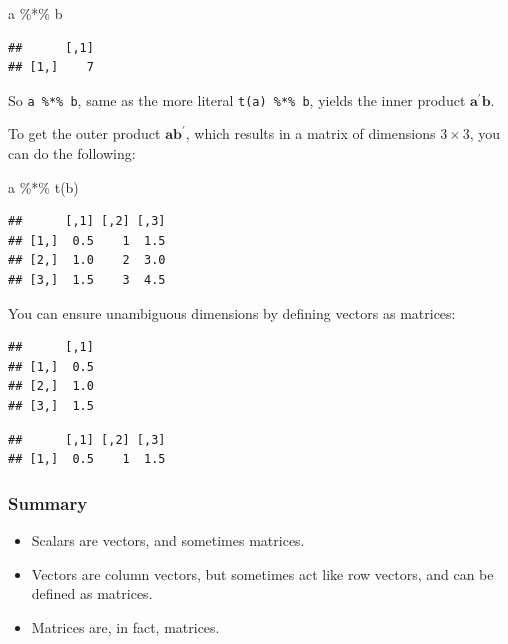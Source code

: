 \documentclass[
  11pt,
]{article}
\newenvironment{Shaded}{\begin{snugshade}}{\end{snugshade}}
\newcommand{\FunctionTok}[1]{\textcolor[rgb]{0.00,0.00,0.00}{#1}}
\newcommand{\NormalTok}[1]{#1}
\newcommand{\SpecialCharTok}[1]{\textcolor[rgb]{0.00,0.00,0.00}{#1}}
\providecommand{\tightlist}{%
  \setlength{\itemsep}{0pt}\setlength{\parskip}{0pt}}
\begin{document}
\begin{Shaded}
\begin{Highlighting}[]
\NormalTok{a }\SpecialCharTok{\%*\%}\NormalTok{ b}
\end{Highlighting}
\end{Shaded}

\begin{verbatim}
##      [,1]
## [1,]    7
\end{verbatim}

So \texttt{a\ \%*\%\ b}, same as the more literal \texttt{t(a)\ \%*\%\ b}, yields the inner product \(\mathbf{a}^{\prime} \mathbf{b}\).

To get the outer product \(\mathbf{a}\mathbf{b}^{\prime}\), which results in a matrix of dimensions \(3 \times 3\), you can do the following:

\begin{Shaded}
\begin{Highlighting}[]
\NormalTok{a }\SpecialCharTok{\%*\%} \FunctionTok{t}\NormalTok{(b)}
\end{Highlighting}
\end{Shaded}

\begin{verbatim}
##      [,1] [,2] [,3]
## [1,]  0.5    1  1.5
## [2,]  1.0    2  3.0
## [3,]  1.5    3  4.5
\end{verbatim}

You can ensure unambiguous dimensions by defining vectors as matrices:

\begin{verbatim}
##      [,1]
## [1,]  0.5
## [2,]  1.0
## [3,]  1.5
\end{verbatim}

\begin{verbatim}
##      [,1] [,2] [,3]
## [1,]  0.5    1  1.5
\end{verbatim}

\hypertarget{summary}{%
\subsubsection{Summary}\label{summary}}

\begin{itemize}
\tightlist
\item
  Scalars are vectors, and sometimes matrices.
\item
  Vectors are column vectors, but sometimes act like row vectors, and can be defined as matrices.
\item
  Matrices are, in fact, matrices.
\end{itemize}
\end{document}

